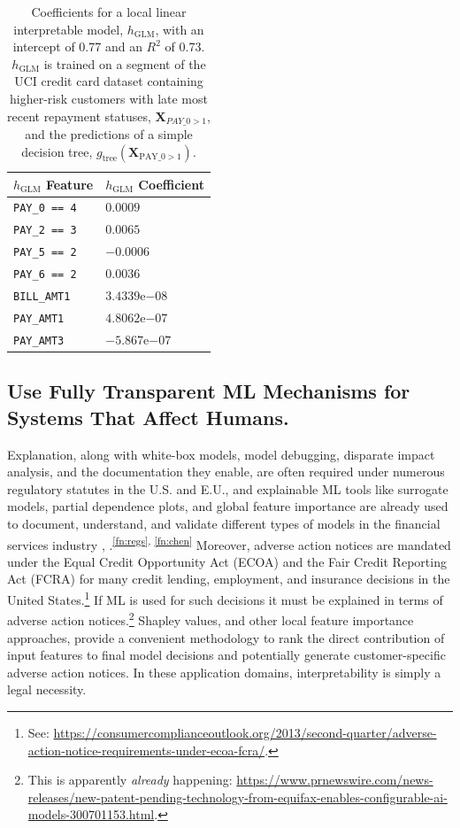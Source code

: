 \documentclass{article}
\begin{document}
\begin{table}
  	\caption{Coefficients for a local linear interpretable model, $h_{\text{GLM}}$, with an intercept of 0.77 and an $R^2$ of 0.73. $h_{\text{GLM}}$ is trained on a segment of the UCI credit card dataset containing higher-risk customers with late most recent repayment statuses, $\mathbf{X}_{PAY \_ 0 > 1}$, and the predictions of a simple decision tree, $g_{\text{tree}}(\mathbf{X}_{\text{PAY\_0} > 1})$.}
  	\label{tab:lime}
  	\centering
  	\begin{tabular}{ll}
    	\toprule
    	$h_{\text{GLM}}$ Feature & $h_{\text{GLM}}$ Coefficient \\
    	\midrule
		\texttt{PAY\_0 == 4} & $0.0009$ \\
		\texttt{PAY\_2 == 3} & $0.0065$ \\
		\texttt{PAY\_5 == 2} & $-0.0006$ \\
		\texttt{PAY\_6 == 2} & $0.0036$ \\			
		\texttt{BILL\_AMT1} & $3.4339\mathrm{e}{-08}$ \\
		\texttt{PAY\_AMT1} & $4.8062\mathrm{e}{-07}$ \\
		\texttt{PAY\_AMT3} & $-5.867\mathrm{e}{-07}$ \\	
    	\bottomrule
  \end{tabular}
\end{table}

\subsection{Use Fully Transparent ML Mechanisms for Systems That Affect Humans.} \label{sec:white_box}

Explanation, along with white-box models, model debugging, disparate impact analysis, and the documentation they enable, are often required under numerous regulatory statutes in the U.S. and E.U., and explainable ML tools like surrogate models, partial dependence plots, and global feature importance are already used to document, understand, and validate different types of models in the financial services industry \cite{lime-sup}, \cite{wf_xnn}.\textsuperscript{\ref{fn:regs}, \ref{fn:chen}} Moreover, adverse action notices are mandated under the Equal Credit Opportunity Act (ECOA) and the Fair Credit Reporting Act (FCRA) for many credit lending, employment, and insurance decisions in the United States.\footnote{See: \url{https://consumercomplianceoutlook.org/2013/second-quarter/adverse-action-notice-requirements-under-ecoa-fcra/}.} If ML is used for such decisions it must be explained in terms of adverse action notices.\footnote{This is apparently \textit{already} happening: \url{https://www.prnewswire.com/news-releases/new-patent-pending-technology-from-equifax-enables-configurable-ai-models-300701153.html}.} Shapley values, and other local feature importance approaches, provide a convenient methodology to rank the direct contribution of input features to final model decisions and potentially generate customer-specific adverse action notices. In these application domains, interpretability is simply a legal necessity.
\end{document}
